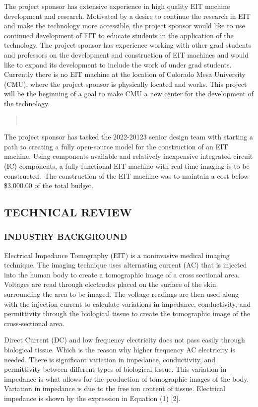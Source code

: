 The project sponsor has extensive experience in high quality EIT machine
development and research. Motivated by a desire to continue the research
in EIT and make the technology more accessible, the project sponsor
would like to use continued development of EIT to educate students in
the application of the technology. The project sponsor has experience
working with other grad students and professors on the development and
construction of EIT machines and would like to expand its development to
include the work of under grad students. Currently there is no EIT
machine at the location of Colorado Mesa University (CMU), where the
project sponsor is physically located and works. This project will be
the beginning of a goal to make CMU a new center for the development of
the technology.~

\begin{quote}
~
\end{quote}

The project sponsor has tasked the 2022-20123 senior design team with
starting a path to creating a fully open-source model for the
construction of an EIT machine. Using components available and
relatively inexpensive integrated circuit (IC) components, a fully
functional EIT machine with real-time imaging is to be constructed.~The
construction of the EIT machine was to maintain a cost below \$3,000.00
of the total budget.

\subsection{TECHNICAL REVIEW}\label{technical-review}

\subsubsection{INDUSTRY BACKGROUND}\label{industry-background}
Electrical Impedance Tomography (EIT) is a noninvasive medical imaging
technique. The imaging technique uses alternating current (AC) that is
injected into the human body to create a tomographic image of a cross
sectional area. Voltages are read through electrodes placed on the
surface of the skin surrounding the area to be imaged. The voltage
readings are then used along with the injection current to calculate
variations in impedance, conductivity, and permittivity through the
biological tissue to create the tomographic image of the cross-sectional
area.~~

Direct Current (DC) and low frequency electricity does not pass easily
through biological tissue. Which is the reason why higher frequency AC
electricity is needed. There is significant variation in impedance,
conductivity, and permittivity between different types of biological
tissue. This variation in impedance is what allows for the production of
tomographic images of the body. Variation in impedance is due to the
free ion content of tissue. Electrical impedance is shown by the
expression in Equation (1) {[}2{]}.~

